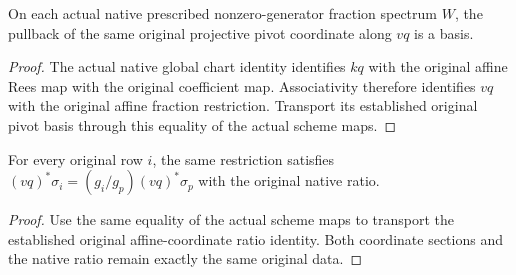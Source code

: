\begin{proposition}
\label{prop:whole-original-global-coordinate-fraction-basis}
\leanok
{}
On each actual native prescribed nonzero-generator fraction spectrum $W$, the
pullback of the same original projective pivot coordinate along $vq$ is a basis.
\end{proposition}
\begin{proof}
The actual native global chart identity identifies $kq$ with the original affine
Rees map with the original coefficient map. Associativity therefore identifies
$vq$ with the original affine fraction restriction. Transport its established
original pivot basis through this equality of the actual scheme maps.
\end{proof}

\begin{proposition}
\label{prop:whole-original-global-coordinate-fraction-ratios}
\leanok
{}
For every original row $i$, the same restriction satisfies
$(vq)^*\sigma_i=(g_i/g_p)(vq)^*\sigma_p$ with the original native ratio.
\end{proposition}
\begin{proof}
Use the same equality of the actual scheme maps to transport the established
original affine-coordinate ratio identity. Both coordinate sections and the
native ratio remain exactly the same original data.
\end{proof}
